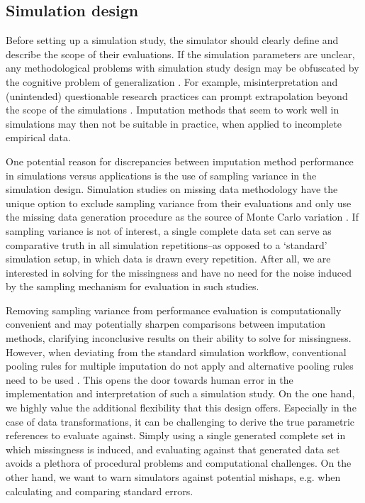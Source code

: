 \documentclass[bimj,fleqn]{w-art}
\begin{document}

\subsection{Simulation design}

Before setting up a simulation study, the simulator should clearly define and describe the scope of their evaluations. If the simulation parameters are unclear, any methodological problems with simulation study design may be obfuscated by the cognitive problem of generalization \citep{gree17}. For example, misinterpretation and (unintended) questionable research practices can prompt extrapolation beyond the scope of the simulations \citep{gree17, pawe22}. Imputation methods that seem to work well in simulations may then not be suitable in practice, when applied to incomplete empirical data.

One potential reason for discrepancies between imputation method performance in simulations versus applications is the use of sampling variance in the simulation design. Simulation studies on missing data methodology have the unique option to exclude sampling variance from their evaluations and only use the missing data generation procedure as the source of Monte Carlo variation \citep{vink14}. If sampling variance is not of interest, a single complete data set can serve as comparative truth in all simulation repetitions--as opposed to a `standard' simulation setup, in which data is drawn every repetition. After all, we are interested in solving for the missingness and have no need for the noise induced by the sampling mechanism for evaluation in such studies. 

Removing sampling variance from performance evaluation is computationally convenient and may potentially sharpen comparisons between imputation methods, clarifying inconclusive results on their ability to solve for missingness. However, when deviating from the standard simulation workflow, conventional pooling rules for multiple imputation \citep[cf.][p. 76-77]{rubi87} do not apply and alternative pooling rules need to be used \citep{raghunathan2003multiple,vink14}. This opens the door towards human error in the implementation and interpretation of such a simulation study. On the one hand, we highly value the additional flexibility that this design offers. Especially in the case of data transformations, it can be challenging to derive the true parametric references to evaluate against. Simply using a single generated complete set in which missingness is induced, and evaluating against that generated data set avoids a plethora of procedural problems and computational challenges. On the other hand, we want to warn simulators against potential mishaps, e.g. when calculating and comparing standard errors.
\end{document}
